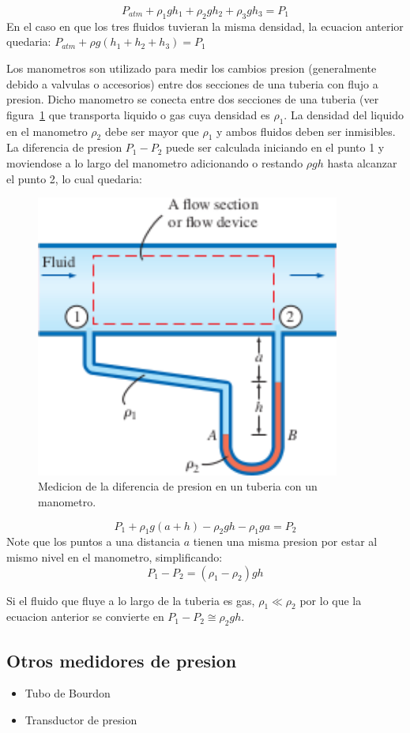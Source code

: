 \documentclass[10pt, oneside]{article}
\begin{document}
$$
P_{atm} + \rho_1 g h_1 + \rho_2 g h_2 + \rho_3 g h_3 = P_1
$$
En el caso en que los tres fluidos tuvieran la misma densidad, la ecuacion anterior quedaria: $P_{atm}+\rho g(h_1 + h_2 + h_3) = P_1$

Los manometros son utilizado para medir los cambios presion (generalmente debido a valvulas o accesorios) entre dos secciones de una tuberia con flujo a presion.  Dicho manometro se conecta entre dos secciones de una tuberia (ver figura~\ref{mano4} que transporta liquido o gas cuya densidad es $\rho_1$. La densidad del liquido en el manometro $\rho_2$ debe ser mayor que $\rho_1$ y ambos fluidos deben ser inmisibles. La diferencia de presion $P_1 - P_2$ puede ser calculada iniciando en el punto 1 y moviendose a lo largo del manometro adicionando o restando $\rho g h$ hasta alcanzar el punto 2, lo cual quedaria:

\begin{figure}[h]
\centering
\includegraphics[width=10cm]{mano4}
\caption{Medicion de la diferencia de presion en un tuberia con un manometro.}
\label{mano4}
\end{figure}

$$
P_1 + \rho_1 g (a+h) - \rho_2 g h - \rho_1 ga = P_2
$$
Note que los puntos a una distancia $a$ tienen una misma presion por estar al mismo nivel en el manometro, simplificando:
$$
P_1 - P_2 = (\rho_1 - \rho_2)gh
$$

Si el fluido que fluye a lo largo de la tuberia es gas, $\rho_1 \ll \rho_2$ por lo que la ecuacion anterior se convierte en $P_1-P_2 \cong \rho_2 g h$.


\subsection{Otros medidores de presion}
\begin{itemize}
\item Tubo de Bourdon
\item Transductor de presion
\end{itemize}
\end{document}
